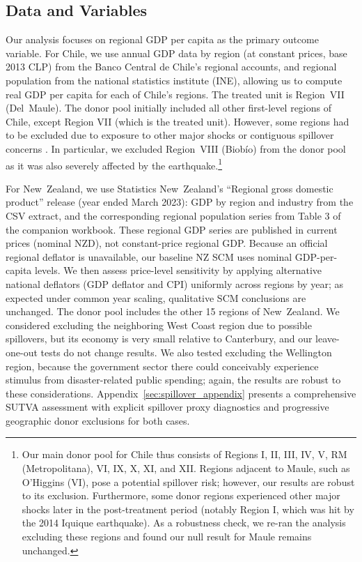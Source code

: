 \documentclass[12pt]{article}
\begin{document}
\subsection{Data and Variables}
Our analysis focuses on regional GDP per capita as the primary outcome variable. For Chile, we use annual GDP data by region (at constant prices, base 2013 CLP) from the Banco Central de Chile’s regional accounts, and regional population from the national statistics institute (INE), allowing us to compute real GDP per capita for each of Chile’s regions. The treated unit is Region VII (Del Maule). The donor pool initially included all other first-level regions of Chile, except Region VII (which is the treated unit). However, some regions had to be excluded due to exposure to other major shocks or contiguous spillover concerns \parencite{abadie2010synthetic, abadie2021jel}. In particular, we excluded Region VIII (Biobío) from the donor pool as it was also severely affected by the earthquake.\footnote{Our main donor pool for Chile thus consists of Regions I, II, III, IV, V, RM (Metropolitana), VI, IX, X, XI, and XII. Regions adjacent to Maule, such as O’Higgins (VI), pose a potential spillover risk; however, our results are robust to its exclusion. Furthermore, some donor regions experienced other major shocks later in the post-treatment period (notably Region I, which was hit by the 2014 Iquique earthquake). As a robustness check, we re-ran the analysis excluding these regions and found our null result for Maule remains unchanged.} 

For New Zealand, we use Statistics New Zealand’s ``Regional gross domestic product'' release (year ended March 2023): GDP by region and industry from the CSV extract, and the corresponding regional population series from Table 3 of the companion workbook. These regional GDP series are published in current prices (nominal NZD), not constant-price regional GDP. Because an official regional deflator is unavailable, our baseline NZ SCM uses nominal GDP-per-capita levels. We then assess price-level sensitivity by applying alternative national deflators (GDP deflator and CPI) uniformly across regions by year; as expected under common year scaling, qualitative SCM conclusions are unchanged. The donor pool includes the other 15 regions of New Zealand. We considered excluding the neighboring West Coast region due to possible spillovers, but its economy is very small relative to Canterbury, and our leave-one-out tests do not change results. We also tested excluding the Wellington region, because the government sector there could conceivably experience stimulus from disaster-related public spending; again, the results are robust to these considerations. Appendix~\ref{sec:spillover_appendix} presents a comprehensive SUTVA assessment with explicit spillover proxy diagnostics and progressive geographic donor exclusions for both cases.
\end{document}

